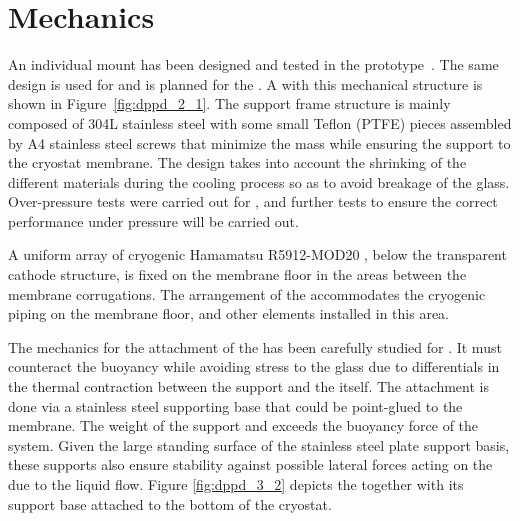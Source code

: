 \section{Mechanics}
\label{sec:fddp-pd-3}


An individual  mount has been designed and tested in the   %
prototype~\cite{Zambelli:2017dkg}. The same design is used for  and is planned %
for the . A  with this mechanical structure is shown in Figure~\ref{fig:dppd_2_1}. The support frame structure is mainly composed of \num{304}L stainless steel with some small Teflon (PTFE) pieces assembled by A4 stainless steel screws that minimize the mass while ensuring the  support to the cryostat membrane. The design %
takes into account the shrinking of the different materials during the cooling process so as to avoid breakage of the  glass.
Over-pressure tests were carried out for , and further tests to ensure the correct performance under pressure will be carried out.


A uniform array of \dpnumpmtch cryogenic Hamamatsu R5912-MOD20 , below the transparent cathode structure, is fixed on the membrane floor in the areas between the membrane corrugations. The arrangement of the  
accommodates the cryogenic piping on the membrane floor, %
and other elements %
installed in this area. %

The mechanics for the attachment of the  has been carefully studied for . It must counteract the  buoyancy while avoiding stress to the  glass due to differentials in the thermal contraction between the support and the  itself. The %
attachment is done via a stainless steel supporting base that could be point-glued to the membrane. The weight of the support and  exceeds the buoyancy force of the system. Given the large standing surface of the stainless steel plate support basis, these supports also ensure stability against possible lateral forces acting on the  due to the liquid flow. Figure \ref{fig:dppd_3_2} depicts the  together with its support base attached to the bottom of the cryostat.

